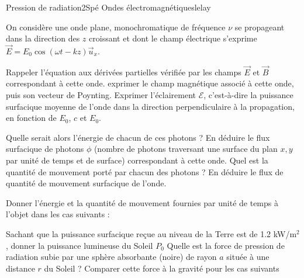 \begin{exercise}{Pression de radiation}{2}{Spé}
{Ondes électromagnétiques}{lelay}

On considère une onde plane, monochromatique de fréquence $\nu$ se propageant dans la direction des $z$ croissant et dont le champ électrique s'exprime $\vec{E} = E_0\cos(\omega t - kz)\vec{u}_x$.
\begin{questions}
    \questioncours Rappeler l'équation aux dérivées partielles vérifiée par les champs $\vec{E}$ et $\vec{B}$ correspondant à cette onde.
    \question exprimer le champ magnétique associé à cette onde, puis son vecteur de Poynting.
    \question Exprimer l'éclairement $\mathcal{E}$, c'est-à-dire la puissance surfacique moyenne de l'onde dans la direction perpendiculaire à la propagation, en fonction de $E_0$, $c$ et $E_0$. 

    
    \question Quelle serait alors l'énergie de chacun de ces photons ?
    \question En déduire le flux surfacique de photons $\phi$ (nombre de photons traversant une surface du plan $x,y$ par unité de temps et de surface) correspondant à cette onde.
    \question Quel est la quantité de mouvement porté par chacun des photons ? En déduire le flux de quantité de mouvement surfacique de l'onde.
    
    
    \question Donner l'énergie et la quantité de mouvement fournies par unité de temps à l'objet dans les cas suivants :
    \question Sachant que la puissance surfacique reçue au niveau de la Terre est de 1.2 kW/m$^2$, donner la puissance lumineuse du Soleil $P_0$
    \question Quelle est la force de pression de radiation subie par une sphère absorbante (noire) de rayon $a$ située à une distance $r$ du Soleil ?
    \question Comparer cette force à la gravité pour les cas suivants
    \begin{parts}

\end{parts}
\end{questions}
\end{exercise}
